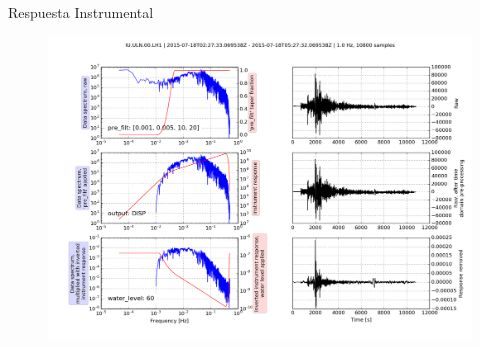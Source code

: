 \documentclass[11pt]{beamer}
\begin{document}
\begin{frame}{Respuesta Instrumental}
\begin{figure}
\begin{center}
\includegraphics[scale=0.2]{respuesta.png}
\end{center}
\end{figure}
\end{frame}
\end{document}
